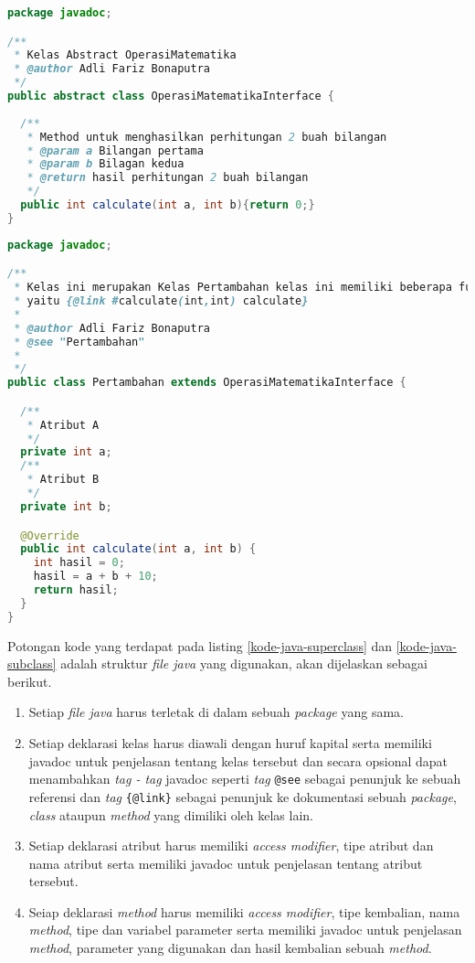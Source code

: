 \begin{lstlisting}[language=Java, caption=Contoh kode {\it java} dari {\it superclass} yang diuji, label={kode-java-superclass}]
package javadoc;

/**
 * Kelas Abstract OperasiMatematika
 * @author Adli Fariz Bonaputra
 */
public abstract class OperasiMatematikaInterface {
  
  /**
   * Method untuk menghasilkan perhitungan 2 buah bilangan
   * @param a Bilangan pertama
   * @param b Bilagan kedua
   * @return hasil perhitungan 2 buah bilangan
   */
  public int calculate(int a, int b){return 0;}
}
\end{lstlisting}

\begin{lstlisting}[language=Java, caption=Contoh kode {\it java} dari {\it subclass} yang diuji, label={kode-java-subclass}]
package javadoc;

/**
 * Kelas ini merupakan Kelas Pertambahan kelas ini memiliki beberapa fungsi
 * yaitu {@link #calculate(int,int) calculate}
 *
 * @author Adli Fariz Bonaputra
 * @see "Pertambahan"
 *
 */
public class Pertambahan extends OperasiMatematikaInterface {

  /**
   * Atribut A
   */
  private int a;
  /**
   * Atribut B
   */
  private int b;

  @Override
  public int calculate(int a, int b) {
    int hasil = 0;
    hasil = a + b + 10;
    return hasil;
  }
}
\end{lstlisting}

Potongan kode yang terdapat pada listing \ref{kode-java-superclass} dan \ref{kode-java-subclass} adalah struktur {\it file java} yang digunakan, akan dijelaskan sebagai berikut.

\begin{enumerate}
	\item Setiap {\it file java} harus terletak di dalam sebuah {\it package} yang sama.
	\item Setiap deklarasi kelas harus diawali dengan huruf kapital serta memiliki javadoc untuk penjelasan tentang kelas tersebut dan secara opsional dapat menambahkan {\it tag - tag} javadoc seperti {\it tag} \texttt{@see} sebagai penunjuk ke sebuah referensi dan {\it tag} \texttt{\{@link\}} sebagai penunjuk ke dokumentasi sebuah {\it package}, {\it class} ataupun {\it method} yang dimiliki oleh kelas lain.
	\item Setiap deklarasi atribut harus memiliki {\it access modifier}, tipe atribut dan nama atribut serta memiliki javadoc untuk penjelasan tentang atribut tersebut.
	\item Seiap deklarasi {\it method} harus memiliki {\it access modifier}, tipe kembalian, nama {\it method}, tipe dan variabel parameter serta memiliki javadoc untuk penjelasan {\it method}, parameter yang digunakan dan hasil kembalian sebuah {\it method}.
\end{enumerate}

